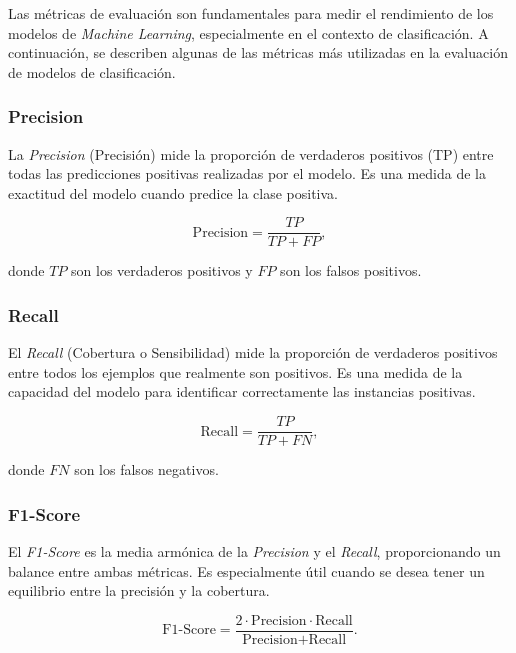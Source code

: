 \documentclass[a4paper,12pt, twoside]{report}
\begin{document}
Las métricas de evaluación son fundamentales para medir el rendimiento de los modelos de \textit{Machine Learning}, especialmente en el contexto de clasificación. A continuación, se describen algunas de las métricas más utilizadas en la evaluación de modelos de clasificación.

\subsubsection{Precision}

La \textit{Precision} (Precisión) mide la proporción de verdaderos positivos (TP) entre todas las predicciones positivas realizadas por el modelo. Es una medida de la exactitud del modelo cuando predice la clase positiva.

\begin{equation}
\text{Precision} = \frac{TP}{TP + FP},
\end{equation}

donde $TP$ son los verdaderos positivos y $FP$ son los falsos positivos.

\subsubsection{Recall}

El \textit{Recall} (Cobertura o Sensibilidad) mide la proporción de verdaderos positivos entre todos los ejemplos que realmente son positivos. Es una medida de la capacidad del modelo para identificar correctamente las instancias positivas.

\begin{equation}
\text{Recall} = \frac{TP}{TP + FN},
\end{equation}

donde $FN$ son los falsos negativos.

\subsubsection{F1-Score}

El \textit{F1-Score} es la media armónica de la \textit{Precision} y el \textit{Recall}, proporcionando un balance entre ambas métricas. Es especialmente útil cuando se desea tener un equilibrio entre la precisión y la cobertura.

\begin{equation}
\text{F1-Score} = \frac{2 \cdot \text{Precision} \cdot \text{Recall}}{\text{Precision} + \text{Recall}}.
\end{equation}
\end{document}
